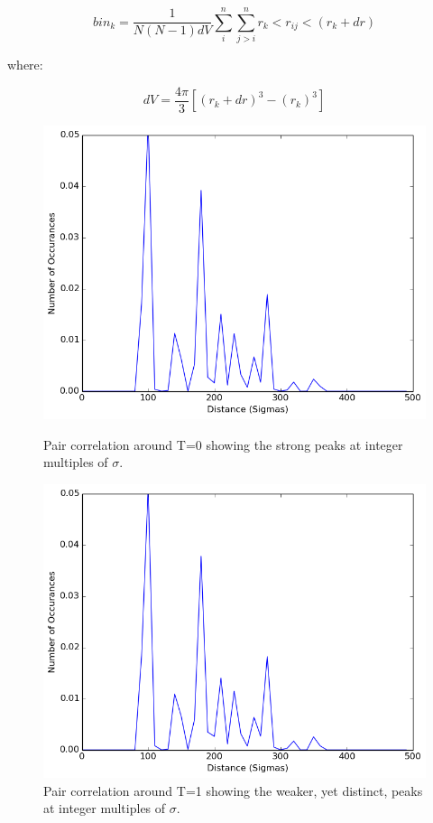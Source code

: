 \documentclass[10pt]{article}
\newcommand{\beq}{\begin{equation}}
\newcommand{\eeq}{\end{equation}}
\begin{document}
\beq
\label{eqn:equation12}
bin_k = \frac{1}{N(N-1)dV}\sum\limits_{i}^n\sum\limits_{j>i}^nr_k<r_{ij}<(r_{k}+dr)
\eeq

where:

\beq
\label{eqn:equation13}
dV = \frac{4\pi}{3}[(r_k+dr)^3-(r_k)^3]
\eeq

\begin{figure}[H]
\centering
\begin{minipage}{.45\textwidth}
\centering
\includegraphics[width=1 \linewidth]{figures/correlation0.png}
\caption{Pair correlation around T=0 showing the strong peaks at integer multiples of $\sigma$.}
\label{fig:figure7}
\end{minipage}\hfill
\quad	
\begin{minipage}{.45\textwidth}
\centering
\includegraphics[width=1 \linewidth]{figures/correlation2.png}
\caption{Pair correlation around T=1 showing the weaker, yet distinct, peaks at integer multiples of $\sigma$.}
\label{fig:figure8}
\end{minipage}\hfill
\end{figure}
\end{document}
